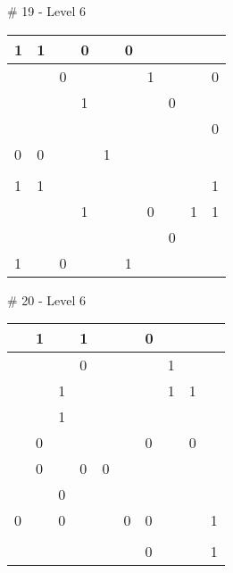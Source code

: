 \medskip

\# 19 - Level 6 \newline
\begin{tabular}{|m{\collen}|m{\collen}|m{\collen}|m{\collen}|m{\collen}|m{\collen}|m{\collen}|m{\collen}|m{\collen}|m{\collen}|}
\hline
  1 & 1 &   & 0 &   & 0 &   &   &   &   \\
\hline
    &   & 0 &   &   &   & 1 &   &   & 0 \\
\hline
    &   &   & 1 &   &   &   & 0 &   &   \\
\hline
    &   &   &   &   &   &   &   &   & 0 \\
\hline
  0 & 0 &   &   & 1 &   &   &   &   &   \\
\hline
    &   &   &   &   &   &   &   &   &   \\
\hline
  1 & 1 &   &   &   &   &   &   &   & 1 \\
\hline
    &   &   & 1 &   &   & 0 &   & 1 & 1 \\
\hline
    &   &   &   &   &   &   & 0 &   &   \\
\hline
  1 &   & 0 &   &   & 1 &   &   &   &   \\
\hline
\end{tabular}


\medskip

\# 20 - Level 6 \newline
\begin{tabular}{|m{\collen}|m{\collen}|m{\collen}|m{\collen}|m{\collen}|m{\collen}|m{\collen}|m{\collen}|m{\collen}|m{\collen}|}
\hline
    & 1 &   & 1 &   &   & 0 &   &   &   \\
\hline
    &   &   & 0 &   &   &   & 1 &   &   \\
\hline
    &   & 1 &   &   &   &   & 1 & 1 &   \\
\hline
    &   & 1 &   &   &   &   &   &   &   \\
\hline
    & 0 &   &   &   &   & 0 &   & 0 &   \\
\hline
    & 0 &   & 0 & 0 &   &   &   &   &   \\
\hline
    &   & 0 &   &   &   &   &   &   &   \\
\hline
  0 &   & 0 &   &   & 0 & 0 &   &   & 1 \\
\hline
    &   &   &   &   &   &   &   &   &   \\
\hline
    &   &   &   &   &   & 0 &   &   & 1 \\
\hline
\end{tabular}


\medskip

